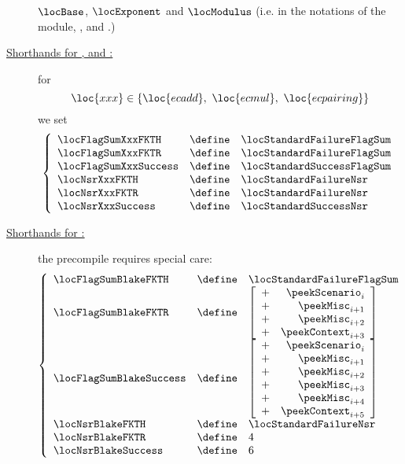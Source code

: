 \begin{description}
		$\locBase$,
		$\locExponent$
		and $\locModulus$ (i.e. in the notations of the \oobMod{} module,
		\locBbs{},
		\locEbs{}
		and \locMbs{}.)
	\item[\underline{\underline{Shorthands for \instEcadd{}, \instEcmul{} and \instEcpairing{}:}}]
		for
		\[
			\loc{xxx} \in \left\{ \loc{ecadd}, ~ \loc{ecmul}, ~ \loc{ecpairing} \right\}
		\]
		we set
		\[
			\left\{ \begin{array}{lcl}
				\locFlagSumXxxFKTH    & \define & \locStandardFailureFlagSum \\
				\locFlagSumXxxFKTR    & \define & \locStandardFailureFlagSum \\
				\locFlagSumXxxSuccess & \define & \locStandardSuccessFlagSum \\
				\locNsrXxxFKTH        & \define & \locStandardFailureNsr     \\
				\locNsrXxxFKTR        & \define & \locStandardFailureNsr     \\
				\locNsrXxxSuccess     & \define & \locStandardSuccessNsr     \\
			\end{array} \right.
		\]
	\item[\underline{\underline{Shorthands for \instBlake{}:}}] the \instBlake{} precompile requires special care:
		\[
			\left\{ \begin{array}{lcl}
				\locFlagSumBlakeFKTH        & \define & \locStandardFailureFlagSum \\
				\locFlagSumBlakeFKTR        & \define & 
				\left[ \begin{array}{cr}
					+ & \peekScenario _{i    } \\
					+ & \peekMisc     _{i + 1} \\
					+ & \peekMisc     _{i + 2} \\
					+ & \peekContext  _{i + 3} \\
				\end{array} \right] \\
				\locFlagSumBlakeSuccess     & \define & 
				\left[ \begin{array}{cr}
					+ & \peekScenario _{i    } \\
					+ & \peekMisc     _{i + 1} \\
					+ & \peekMisc     _{i + 2} \\
					+ & \peekMisc     _{i + 3} \\
					+ & \peekMisc     _{i + 4} \\
					+ & \peekContext  _{i + 5} \\
				\end{array} \right] \\
				\locNsrBlakeFKTH    & \define & \locStandardFailureNsr \\
				\locNsrBlakeFKTR    & \define & 4                      \\
				\locNsrBlakeSuccess & \define & 6                      \\
			\end{array} \right.
		\]
\end{description}
